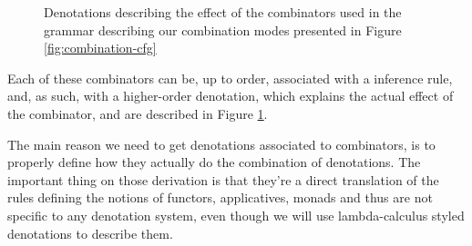 \begin{figure}
	
	\caption{Denotations describing the effect of the combinators used in the
		grammar describing our combination modes presented in
		Figure \ref{fig:combination-cfg}}
	\label{fig:combinator-denotations}
\end{figure}

Each of these combinators can be, up to order, associated with a inference
rule, and, as such, with a higher-order denotation, which explains the actual
effect of the combinator, and are described in
Figure \ref{fig:combinator-denotations}.


The main reason we need to get denotations associated to combinators, is to
properly define how they actually do the combination of denotations.
The important thing on those derivation is that they're a direct translation
of the rules defining the notions of functors, applicatives, monads and thus
are not specific to any denotation system, even though we will use
lambda-calculus styled denotations to describe them.

